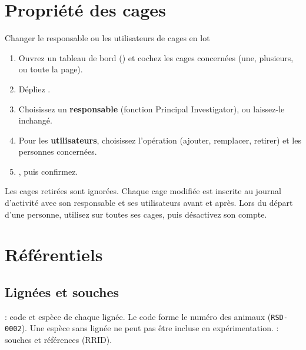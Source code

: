 \documentclass[11pt,a4paper]{article}
\begin{document}
\section{Propriété des cages}\label{sec:propriete}
\begin{procedure}{Changer le responsable ou les utilisateurs de cages en lot}
\begin{enumerate}
  \item Ouvrez un tableau de bord () et
    cochez les cages concernées (une, plusieurs, ou toute la page).
  \item Dépliez .
  \item Choisissez un \textbf{responsable} (fonction Principal
    Investigator), ou laissez-le inchangé.
  \item Pour les \textbf{utilisateurs}, choisissez l'opération (ajouter,
    remplacer, retirer) et les personnes concernées.
  \item {}, puis confirmez.
\end{enumerate}
\end{procedure}
Les cages retirées sont ignorées. Chaque cage modifiée est inscrite au
journal d'activité avec son responsable et ses utilisateurs avant et après.
Lors du départ d'une personne, utilisez  sur toutes ses cages, puis désactivez son compte.

\section{Référentiels}

\subsection{Lignées et souches}\label{sec:lignees}
 : code et espèce de chaque
lignée. Le code forme le numéro des animaux (\texttt{RSD-0002}). Une espèce
sans lignée ne peut pas être incluse en expérimentation.
 : souches et références (RRID).
\end{document}

